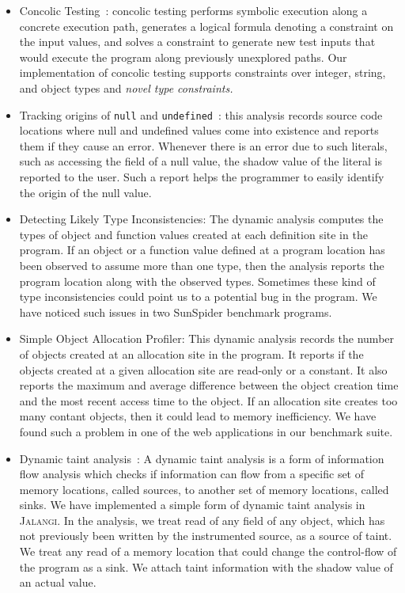 \documentclass{sig-alternate}
\def\jalangi{\textsc{Jalangi}}
\begin{document}
\begin{itemize}
\item Concolic Testing~\cite{dart,cute}: concolic testing performs
  symbolic execution along a concrete execution path, generates a
  logical formula denoting a constraint on the input values, and
  solves a constraint to generate new test inputs that would execute
  the program along previously unexplored paths.  Our implementation
  of concolic testing supports constraints over integer, string, and
  object types and \emph{novel type constraints.}
\item Tracking origins of \texttt{null} and
  \texttt{undefined}~\cite{Bond:2007:TBA:1297027.1297057}: this
  analysis records source code locations where null and undefined
  values come into existence and reports them if they cause an error.
  Whenever there is an error due to such literals, such as accessing
  the field of a null value, the shadow value of the literal is
  reported to the user.  Such a report helps the programmer to easily
  identify the origin of the null value.
\item Detecting Likely Type Inconsistencies: The dynamic analysis
  computes the types of object and function values created at each
  definition site in the program.  If an object or a function value
  defined at a program location has been observed to assume more than
  one type, then the analysis reports the program location along with
  the observed types.  Sometimes these kind of type inconsistencies
  could point us to a potential bug in the program.  We have noticed
  such issues in two SunSpider benchmark programs.
\item Simple Object Allocation Profiler: This dynamic analysis records
  the number of objects created at an allocation site in the program.
  It reports if the objects created at a given allocation site are
  read-only or a constant.  It also reports the maximum and average
  difference between the object creation time and the most recent
  access time to the object.  If an allocation site creates too many
  contant objects, then it could lead to memory inefficiency.  We have
  found such a problem in one of the web applications in our benchmark
  suite.
\item Dynamic taint
  analysis~\cite{songndss05,Clause:2007:DGD:1273463.1273490}: A
  dynamic taint analysis is a form of information flow analysis which
  checks if information can flow from a specific set of memory
  locations, called sources, to another set of memory locations,
  called sinks.  We have implemented a simple form of dynamic taint
  analysis in \jalangi{}.  In the analysis, we treat read of any field
  of any object, which has not previously been written by the
  instrumented source, as a source of taint.  We treat any read of a
  memory location that could change the control-flow of the program as
  a sink.  We attach taint information with the shadow value of an
  actual value.
\end{itemize}
\end{document}
